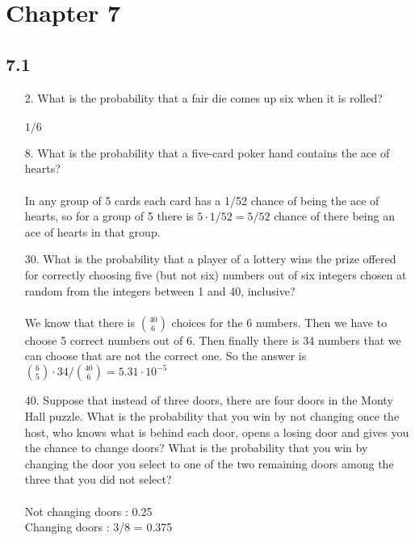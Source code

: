 \section{Chapter 7}
\subsection{7.1}
\begin{itemize}
    \item[2.]  What is the probability that a fair die comes up six when
          it is rolled? \\
          \answer \\
          $1/6$

    \item[8.]  What is the probability that a five-card poker hand contains the ace of hearts? \\
          \answer \\
          In any group of 5 cards each card has a 1/52 chance of being the ace of hearts, so for
          a group of 5 there is $5 \cdot 1/52 = 5/52$ chance of there being an ace of hearts in
          that group.

    \item[30.] What is the probability that a player of a lottery wins
          the prize offered for correctly choosing five (but not six)
          numbers out of six integers chosen at random from the
          integers between 1 and 40, inclusive? \\
          \answer \\
          We know that there is $40 \choose 6$ choices for the 6 numbers. Then we have
          to choose 5 correct numbers out of 6. Then finally there is 34 numbers that we
          can choose that are not the correct one. So the answer is ${6 \choose 5} \cdot 34 / {40 \choose 6} = 5.31 \cdot 10^{-5}$

    \item[40.] Suppose that instead of three doors, there are four doors
          in the Monty Hall puzzle. What is the probability that you
          win by not changing once the host, who knows what is
          behind each door, opens a losing door and gives you the
          chance to change doors? What is the probability that you
          win by changing the door you select to one of the two
          remaining doors among the three that you did not select? \\
          \answer \\
          Not changing doors : 0.25 \\
          Changing doors : 3/8 = 0.375

\end{itemize}


